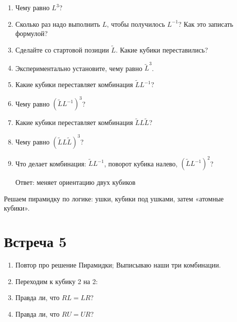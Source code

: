 \documentclass[a4paper, 12pt]{article}
\begin{document}
\begin{enumerate}
  \item Чему равно $L^3$?
  \item Сколько раз надо выполнить $L$, чтобы получилось $L^{-1}$? Как это записать формулой?
  \item Сделайте со стартовой позиции $\tilde L$. Какие кубики переставились?
  \item Экспериментально установите, чему равно $\tilde L^3$.
  \item Какие кубики переставляет комбинация $\tilde L L^{-1}$?
  \item Чему равно $(\tilde L L^{-1})^3$?
  \item Какие кубики переставляет комбинация $\tilde L L \tilde L$?
  \item Чему равно $(\tilde L L \tilde L)^3$?
  \item Что делает комбинация: $\tilde L L^{-1}$, поворот кубика налево, $(\tilde L L^{-1})^2$?

    Ответ: меняет ориентацию двух кубиков 
\end{enumerate}

Решаем пирамидку по логике: ушки, кубики под ушками, затем «атомные кубики».

\section{Встреча 5}

\begin{enumerate}
  \item Повтор про решение Пирамидки; Выписываю наши три комбинации. 
  \item Переходим к кубику 2 на 2:
  \item Правда ли, что $RL=LR$?
  \item Правда ли, что $RU=UR$?
\end{enumerate}
\end{document}
